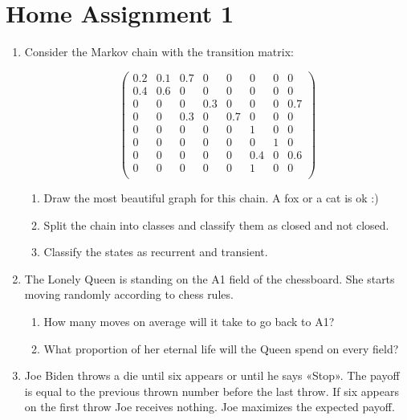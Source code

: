 \documentclass[12pt]{article}
\begin{document}
\section*{Home Assignment 1}
\begin{enumerate}

  \item Consider the Markov chain with the transition matrix:
  
  \[
    \begin{pmatrix}
      0.2   & 0.1 & 0.7 &   0 &   0 &   0 &   0  &  0 \\
      0.4 & 0.6 & 0   &   0 &   0 &   0 &   0  &  0 \\
      0   & 0   & 0   &   0.3 &   0 &   0 &   0  &  0.7 \\
      0   & 0 & 0.3 &   0 &   0.7 &   0 &   0  &  0 \\
      0   & 0 & 0 &   0 &   0 &   1 &   0  &  0 \\
      0   & 0 & 0 &   0 &   0 &   0 &   1  &  0 \\
      0   & 0 & 0 &   0 &   0 &   0.4 &   0  &  0.6 \\
      0   & 0 & 0 &   0 &   0 &   1 &   0  &  0 \\
    \end{pmatrix}  
  \]
  
  
  \begin{enumerate}
    \item Draw the most beautiful graph for this chain. A fox or a cat is ok :)
    \item Split the chain into classes and classify them as closed and not closed.
    \item Classify the states as recurrent and transient.
  \end{enumerate}
  
  \item The Lonely Queen is standing on the A1 field of the chessboard. 
  She starts moving randomly according to chess rules. 

  \begin{enumerate}
    \item How many moves on average will it take to go back to A1?
    \item What proportion of her eternal life will the Queen spend on every field?
  \end{enumerate}

  \item Joe Biden throws a die until six appears or until he says «Stop».
  The payoff is equal to the previous thrown number before the last throw. 
  If six appears on the first throw Joe receives nothing.
  Joe maximizes the expected payoff. 


\end{enumerate}
\end{document}
